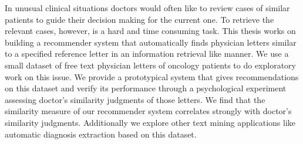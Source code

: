 \documentclass[Thesis.tex]{subfiles}
\begin{document}
\setlength{\parindent}{0cm}
In unusual clinical situations doctors would often like to review cases of similar patients to guide their decision making for the current one. To retrieve the relevant cases, however, is a hard and time consuming task. This thesis works on building a recommender system that automatically finds physician letters similar to a specified reference letter in an information retrieval like manner. We use a small dataset of free text physician letters of oncology patients to do exploratory work on this issue. We provide a prototypical system that gives recommendations on this dataset and verify its performance through a psychological experiment assessing doctor's similarity judgments of those letters. We find that the similarity measure of our recommender system correlates strongly with doctor's similarity judgments. Additionally we explore other text mining applications like automatic diagnosis extraction based on this dataset.
\end{document}

